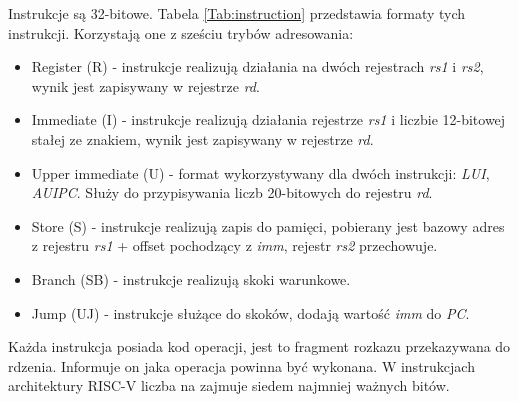 \documentclass[11pt,a4paper]{article}
\begin{document}
				Instrukcje są 32-bitowe. Tabela \ref{Tab:instruction} przedstawia formaty tych instrukcji. Korzystają one z sześciu trybów adresowania:
		\begin{itemize}
			\item Register (R) - instrukcje realizują działania na dwóch rejestrach {\it rs1} i {\it rs2}, wynik jest zapisywany w rejestrze {\it rd}.
			\item Immediate (I) - instrukcje realizują działania rejestrze {\it rs1} i liczbie 12-bitowej stałej ze znakiem, wynik jest zapisywany w rejestrze {\it rd}.
			\item Upper immediate (U) - format wykorzystywany dla dwóch instrukcji: {\it LUI}, {\it AUIPC}. Służy do przypisywania liczb 20-bitowych do rejestru {\it rd}.
			\item Store (S) - instrukcje realizują zapis do pamięci, pobierany jest bazowy adres z rejestru {\it rs1} + offset pochodzący z {\it imm}, rejestr {\it rs2} przechowuje.
			\item Branch (SB) - instrukcje realizują skoki warunkowe.
			\item Jump (UJ) - instrukcje służące do skoków, dodają wartość {\it imm} do {\it PC}.
		\end{itemize}
Każda instrukcja posiada kod operacji, jest to fragment rozkazu przekazywana do rdzenia. Informuje on jaka operacja powinna być wykonana. W instrukcjach architektury RISC-V liczba na zajmuje siedem najmniej ważnych bitów.
\end{document}
